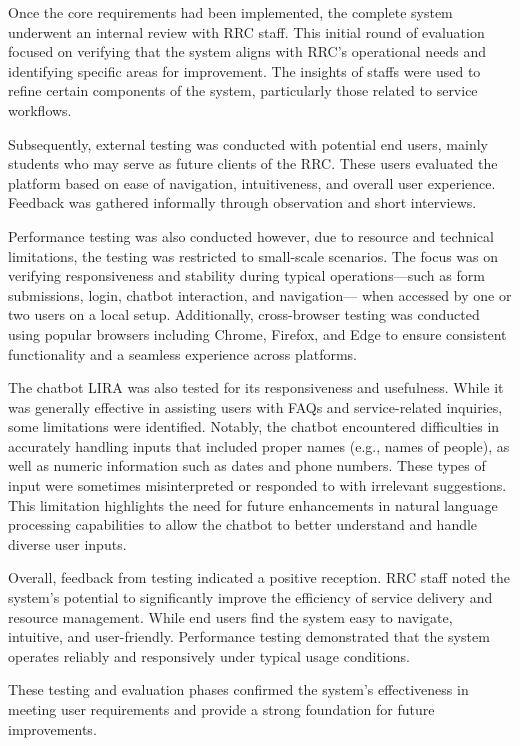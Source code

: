 Once the core requirements had been implemented, the complete system underwent an internal review with RRC staff. This initial round of evaluation focused on verifying that the system aligns with RRC's operational needs and identifying specific areas for improvement. The insights of staffs were used to refine certain components of the system, particularly those related to service workflows. 

Subsequently, external testing was conducted with potential end users, mainly students who may serve as future clients of the RRC. These users evaluated the platform based on ease of navigation, intuitiveness, and overall user experience. Feedback was gathered informally through observation and short interviews.

Performance testing was also conducted however, due to resource and technical limitations, the testing was restricted to small-scale scenarios. The focus was on verifying responsiveness and stability during typical operations—such as form submissions, login, chatbot interaction, and navigation— when accessed by one or two users on a local setup. Additionally, cross-browser testing was conducted using popular browsers including Chrome, Firefox, and Edge to ensure consistent functionality and a seamless experience across platforms.

The chatbot LIRA was also tested for its responsiveness and usefulness. While it was generally effective in assisting users with FAQs and service-related inquiries, some limitations were identified. Notably, the chatbot encountered difficulties in accurately handling inputs that included proper names (e.g., names of people), as well as numeric information such as dates and phone numbers. These types of input were sometimes misinterpreted or responded to with irrelevant suggestions. This limitation highlights the need for future enhancements in natural language processing capabilities to allow the chatbot to better understand and handle diverse user inputs.

Overall, feedback from testing indicated a positive reception. RRC staff noted the system’s potential to significantly improve the efficiency of service delivery and resource management. While end users find the system easy to navigate, intuitive, and user-friendly. Performance testing demonstrated that the system operates reliably and responsively under typical usage conditions.

These testing and evaluation phases confirmed the system’s effectiveness in meeting user requirements and provide a strong foundation for future improvements.


